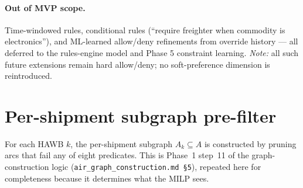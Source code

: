 \documentclass[11pt,a4paper]{article}
\theoremstyle{definition}
\begin{document}
\paragraph{Out of MVP scope.}
Time-windowed rules, conditional rules (``require freighter when commodity
is electronics''), and ML-learned allow/deny refinements from override
history --- all deferred to the rules-engine model and Phase 5
constraint learning. \emph{Note:} all such future extensions remain hard
allow/deny; no soft-preference dimension is reintroduced.

\section{Per-shipment subgraph pre-filter}
\label{sec:prefilter}

For each HAWB $k$, the per-shipment subgraph $A_k \subseteq A$ is constructed
by pruning arcs that fail any of eight predicates. This is Phase~1 step~11 of
the graph-construction logic (\texttt{air\_graph\_construction.md \S5}),
repeated here for completeness because it determines what the MILP sees.
\end{document}
